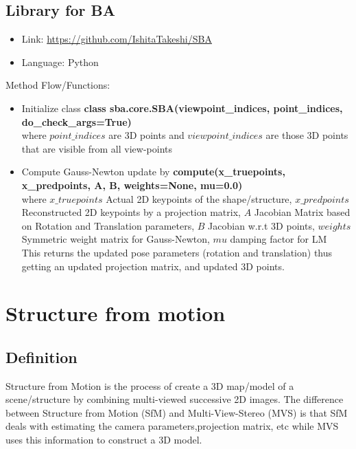 \documentclass{article}[11pt]
\begin{document}
\subsection{Library for BA}
\begin{itemize}
    \item Link: \url{https://github.com/IshitaTakeshi/SBA}
    \item Language: Python

\end{itemize}

Method Flow/Functions:

\begin{itemize}
    \item Initialize class \textbf{class sba.core.SBA(viewpoint\_indices, point\_indices, do\_check\_args=True)}
    \\ where $point\_indices$ are 3D points and $viewpoint\_indices$ are those 3D points that are visible from all view-points
    \item Compute Gauss-Newton update by \textbf{compute(x\_truepoints, x\_predpoints, A, B, weights=None, mu=0.0)}
    \\ where $x\_truepoints$ Actual 2D keypoints of the shape/structure, $x\_predpoints$ Reconstructed 2D keypoints by a projection matrix, $A$ Jacobian Matrix based on Rotation and Translation parameters, $B$ Jacobian w.r.t 3D points, $weights$ Symmetric weight matrix for Gauss-Newton, $mu$ damping factor for LM
    \\ This returns the updated pose parameters (rotation and translation) thus getting an updated projection matrix, and updated 3D points.
    
\end{itemize}

\section{Structure from motion}
\subsection{Definition}

Structure from Motion is the process of create a 3D map/model of a scene/structure by combining multi-viewed successive 2D images. The difference between Structure from Motion (SfM) and Multi-View-Stereo (MVS) is that SfM deals with estimating the camera parameters,projection matrix, etc while MVS uses this information to construct a 3D model. 
\end{document}
